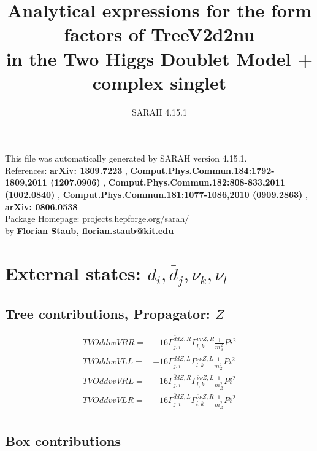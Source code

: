 \documentclass[A4,landscape]{article}
\begin{document}
\title{Analytical expressions for the form factors of TreeV2d2nu\\ in the Two Higgs Doublet Model + complex singlet } 
 \author{SARAH 4.15.1} 
 \maketitle 
 \vspace{10cm} 
This file was automatically generated by SARAH version 4.15.1.  \\ 
References: {\bf arXiv: 1309.7223 }, {\bf Comput.Phys.Commun.184:1792-1809,2011 (1207.0906) }, {\bf Comput.Phys.Commun.182:808-833,2011 (1002.0840) }, {\bf Comput.Phys.Commun.181:1077-1086,2010 (0909.2863) }, {\bf arXiv: 0806.0538 } \\ 
Package Homepage: projects.hepforge.org/sarah/ \\ 
by {\bf Florian Staub, florian.staub@kit.edu} 
 \pagebreak 
 \tableofcontents 
 \pagebreak 
\section{External states: ${d_{{i}}, \bar{d}_{{j}}, \nu_{{k}}, \bar{\nu}_{{l}}}$} 
\subsection{Tree contributions, Propagator: $Z$} 

\begin{align} 
  TVOddvvVRR= & -16 \Gamma^{\bar{d}d Z ,R}_{j, i} \Gamma^{\bar{\nu}\nu Z ,R}_{l, k} \frac{1}{m^2_{Z}} Pi^2 \\ 
  TVOddvvVLL= & -16 \Gamma^{\bar{d}d Z ,L}_{j, i} \Gamma^{\bar{\nu}\nu Z ,L}_{l, k} \frac{1}{m^2_{Z}} Pi^2 \\ 
  TVOddvvVRL= & -16 \Gamma^{\bar{d}d Z ,R}_{j, i} \Gamma^{\bar{\nu}\nu Z ,L}_{l, k} \frac{1}{m^2_{Z}} Pi^2 \\ 
  TVOddvvVLR= & -16 \Gamma^{\bar{d}d Z ,L}_{j, i} \Gamma^{\bar{\nu}\nu Z ,R}_{l, k} \frac{1}{m^2_{Z}} Pi^2 \\ 
\end{align} 
\subsection{Box contributions} 
\end{document}
